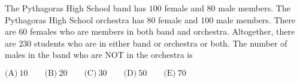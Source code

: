 

The Pythagoras High School band has $100$ female and $80$ male members. The Pythagoras High School orchestra has $80$ female and $100$ male members. There are $60$ females who are members in both band and orchestra. Altogether, there are $230$ students who are in either band or orchestra or both. The number of males in the band who are NOT in the orchestra is

$\text{(A)}\ 10 \qquad \text{(B)}\ 20 \qquad \text{(C)}\ 30 \qquad \text{(D)}\ 50 \qquad \text{(E)}\ 70$
